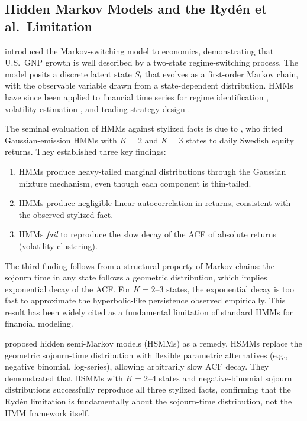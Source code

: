 \subsection{Hidden Markov Models and the Ryd\'{e}n et al.\ Limitation}

\citet{hamilton1989new} introduced the Markov-switching model to economics, demonstrating that U.S.\ GNP growth is well described by a two-state regime-switching process.
The model posits a discrete latent state $S_t$ that evolves as a first-order Markov chain, with the observable variable drawn from a state-dependent distribution.
HMMs have since been applied to financial time series for regime identification \citep{kim1999has}, volatility estimation \citep{rossi2006volatility}, and trading strategy design \citep{nguyen2018hidden}.

The seminal evaluation of HMMs against stylized facts is due to \citet{ryden1998stylized}, who fitted Gaussian-emission HMMs with $K = 2$ and $K = 3$ states to daily Swedish equity returns.
They established three key findings:
\begin{enumerate}
    \item HMMs produce heavy-tailed marginal distributions through the Gaussian mixture mechanism, even though each component is thin-tailed.
    \item HMMs produce negligible linear autocorrelation in returns, consistent with the observed stylized fact.
    \item HMMs \emph{fail} to reproduce the slow decay of the ACF of absolute returns (volatility clustering).
\end{enumerate}
The third finding follows from a structural property of Markov chains: the sojourn time in any state follows a geometric distribution, which implies exponential decay of the ACF.
For $K = 2$--$3$ states, the exponential decay is too fast to approximate the hyperbolic-like persistence observed empirically.
This result has been widely cited as a fundamental limitation of standard HMMs for financial modeling.

\citet{bulla2006stylized} proposed hidden semi-Markov models (HSMMs) as a remedy.
HSMMs replace the geometric sojourn-time distribution with flexible parametric alternatives (e.g., negative binomial, log-series), allowing arbitrarily slow ACF decay.
They demonstrated that HSMMs with $K = 2$--$4$ states and negative-binomial sojourn distributions successfully reproduce all three stylized facts, confirming that the Ryd\'{e}n limitation is fundamentally about the sojourn-time distribution, not the HMM framework itself.

